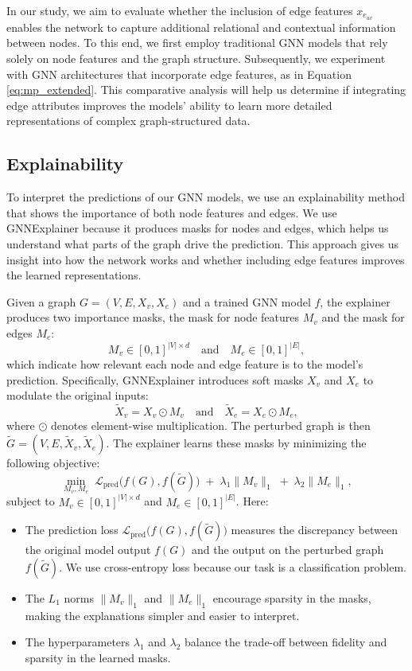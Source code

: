 \documentclass[journal]{IEEEtran}
\begin{document}
In our study, we aim to evaluate whether the inclusion of edge features $x_{e_{uv}}$ enables the network to capture additional relational and contextual information between nodes. To this end, we first employ traditional GNN models that rely solely on node features and the graph structure. Subsequently, we experiment with GNN architectures that incorporate edge features, as in Equation \ref{eq:mp_extended}. This comparative analysis will help us determine if integrating edge attributes improves the models’ ability to learn more detailed representations of complex graph-structured data.



\subsection{Explainability} \label{sec:explainability}

To interpret the predictions of our GNN models, we use an explainability method that shows the importance of both node features and edges. We use GNNExplainer \cite{ying2019gnnexplainer} because it produces masks for nodes and edges, which helps us understand what parts of the graph drive the prediction. This approach gives us insight into how the network works and whether including edge features improves the learned representations.

Given a graph $G = (V, E, X_v, X_e)$ and a trained GNN model $f$, the explainer produces two importance masks, the mask for node features $M_v$ and the mask for edges $M_e$:
\[
M_v \in [0,1]^{|V|\times d} \quad \text{and} \quad M_e \in [0,1]^{|E|},
\]
which indicate how relevant each node and edge feature is to the model’s prediction. Specifically, GNNExplainer introduces soft masks $X_v$ and $X_e$ to modulate the original inputs:
\[
\tilde{X}_v = X_v \odot M_v \quad \text{and} \quad \tilde{X}_e = X_e \odot M_e,
\]
where $\odot$ denotes element-wise multiplication. The perturbed graph is then $\tilde{G} = (V, E, \tilde{X}_v, \tilde{X}_e)$. The explainer learns these masks by minimizing the following objective:
\[
\min_{M_v, M_e} \; \mathcal{L}_{\text{pred}}\bigl(f(G), f(\tilde{G})\bigr) \;+\; \lambda_1 \|M_v\|_1 \;+\; \lambda_2 \|M_e\|_1,
\]
subject to $M_v \in [0,1]^{|V|\times d}$ and $M_e \in [0,1]^{|E|}$. Here:
\begin{itemize}
    \item The prediction loss $\mathcal{L}_{\text{pred}}\bigl(f(G), f(\tilde{G})\bigr)$ measures the discrepancy between the original model output $f(G)$ and the output on the perturbed graph $f(\tilde{G})$. We use cross-entropy loss because our task is a classification problem. %
    \item The $L_1$ norms $\|M_v\|_1$ and $\|M_e\|_1$ encourage sparsity in the masks, making the explanations simpler and easier to interpret.
    \item The hyperparameters $\lambda_1$ and $\lambda_2$ balance the trade-off between fidelity and sparsity in the learned masks.
\end{itemize}
\end{document}
